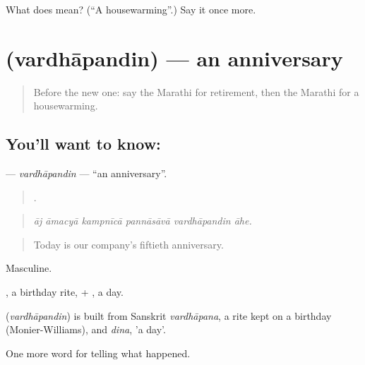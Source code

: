 \begin{tcolorbox}[breakable,colback=teal!4,colframe=teal!35!black,title={Before you move on}]
What does  mean? (\textquotedblleft{}A housewarming\textquotedblright{}.) Say it once more.
\end{tcolorbox}
\section[\texorpdfstring{\mr{वर्धापनदिन} (vardhāpandin)}{वर्धापनदिन (vardhāpandin)}]{ (vardhāpandin) — an anniversary}

\label{lesson:MR-C323-vardhapandin}



\begin{quote}
Before the new one: say the Marathi for retirement, then the Marathi for a housewarming.
\end{quote}

\subsection*{You'll want to know: }
\textbf{} — \emph{vardhāpandin} — \textquotedblleft{}an anniversary\textquotedblright{}.

\begin{quote}
     .
\end{quote}

\begin{quote}
\emph{āj āmacyā kampnīcā pannāsāvā vardhāpandin āhe.}
\end{quote}

\begin{quote}
Today is our company's fiftieth anniversary.
\end{quote}

Masculine.

, a birthday rite, + , a day.

\begin{cousinweb}
\textbf{} (\emph{vardhāpandin}) is built from Sanskrit \emph{vardhāpana}, a rite kept on a birthday (Monier-Williams), and \emph{dina}, 'a day'.
\end{cousinweb}

\begin{grammarlens}[title={What you've built}]
One more word for telling what happened.
\end{grammarlens}

